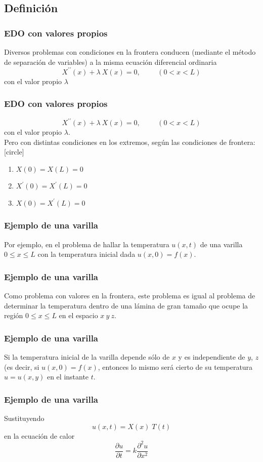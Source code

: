 \subsection{Definición}
\begin{frame}
\frametitle{EDO con valores propios}
Diversos problemas con condiciones en la frontera conducen (mediante el método de separación de variables) a la misma ecuación diferencial ordinaria
\[ X^{\prime \prime}(x) + \lambda \: X(x) = 0, \hspace{1cm} (0 < x < L)\]
con el valor propio $\lambda$
\end{frame}
\begin{frame}
\frametitle{EDO con valores propios}
\[ X^{\prime \prime}(x) + \lambda \: X(x) = 0, \hspace{1cm} (0 < x < L)\]
con el valor propio $\lambda$.
\\
\bigskip
Pero con distintas condiciones en los extremos, según las condiciones de frontera:
[circle]
\begin{enumerate}[<+->]
\item $X(0) = X(L) = 0$
\item $X^{\prime}(0) = X^{\prime}(L) = 0$
\item $X(0) = X^{\prime}(L) = 0$
\end{enumerate}
\end{frame}
\begin{frame}
\frametitle{Ejemplo de una varilla}
Por ejemplo, en el problema de hallar la temperatura $u(x, t)$ de una varilla $0 \leq x \leq L$ con la temperatura inicial dada $u(x,0)=f(x)$.
\end{frame}
\begin{frame}
\frametitle{Ejemplo de una varilla}
Como problema con valores en la frontera, este problema es igual al problema de determinar la temperatura dentro de una lámina de gran tamaño que ocupe la región $0 \leq x \leq L$ en el espacio $x \ y \ z$.
\end{frame}
\begin{frame}
\frametitle{Ejemplo de una varilla}
Si la temperatura inicial de la varilla depende sólo de $x$ y es independiente de $y$, $z$ (es decir, si $u(x,0)= f(x)$, entonces lo mismo será cierto de su temperatura $u=u(x,y)$ en el instante $t$. 
\end{frame}
\begin{frame}
\frametitle{Ejemplo de una varilla}
Sustituyendo
\[u(x, t) = X(x) \; T(t)\]
en la ecuación de calor
\[ \dfrac{\partial u}{\partial t} = k \dfrac{\partial^{2} u}{\partial x^{2}}\]
\end{frame}

